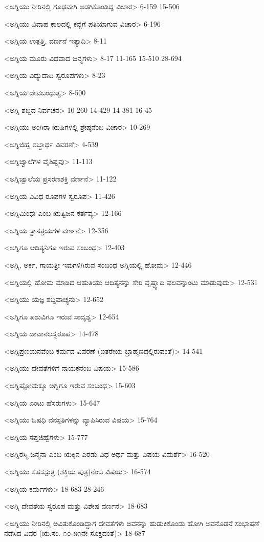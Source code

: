 <ಅಗ್ನಿಯು ನೀರಿನಲ್ಲಿ ಗೂಢವಾಗಿ ಅಡಗಿಕೊಂಡಿದ್ದ ವಿಚಾರ>
6-159
15-506

<ಅಗ್ನಿಯು ವಿವಾಹ ಕಾಲದಲ್ಲಿ ಕನ್ಯೆಗೆ ಪತಿಯಾಗುವ ವಿಚಾರ>
6-196

<ಅಗ್ನಿಯ ಉತ್ಪತ್ತಿ, ವರ್ಣನೆ ಇತ್ಯಾದಿ>
8-11

<ಅಗ್ನಿಯ ಮೂರು ವಿಧವಾದ ಜನ್ಮಗಳು>
8-17 
11-165 
15-510
28-694

<ಅಗ್ನಿಯ ವಿದ್ಯುದಾದಿ ಸ್ವರೂಪಗಳು>
8-23

<ಅಗ್ನಿಯ ದೇವಬಂಧುತ್ವ>
8-500

<ಅಗ್ನಿ ಶಬ್ದದ ನಿರ್ವಚನ>
10-260
14-429 
14-381
16-45

<ಅಗ್ನಿಯು ಅಂಗಿರಾ ಋಷಿಗಳಲ್ಲಿ ಶ್ರೇಷ್ಠನೆಂಬ ವಿಚಾರ>
10-269

<ಅಗ್ನಿಜಿಹ್ವ ಶಬ್ದಾರ್ಥ ವಿವರಣೆ>
4-539

<ಅಗ್ನಿಜ್ವಾಲೆಗಳ ವೈಶಿಷ್ಟ್ಯವು>
11-113

<ಅಗ್ನಿಜ್ವಾಲೆಯ ಪ್ರಸರಣಶಕ್ತಿ ವರ್ಣನೆ>
11-122

<ಅಗ್ನಿಯ ವಿವಿಧ ರೂಪಗಳ ಸ್ವರೂಪ>
11-426

<ಅಗ್ನಿಮಿಂಧಃ ಎಂಬ ಋತ್ವಿಜನ ಕರ್ತವ್ಯ>
12-166

<ಅಗ್ನಿಯ ಸ್ಥಾನತ್ರಯಗಳ ವರ್ಣನೆ>
12-356

<ಅಗ್ನಿಗೂ ಆದಿತ್ಯನಿಗೂ ಇರುವ ಸಂಬಂಧ>
12-403

<ಅಗ್ನಿ, ಅರ್ಕ, ಗಾಯತ್ರೀ ಇವುಗಳಿಗಿರುವ ಸಂಬಂಧ ಅಗ್ನಿಯಲ್ಲಿ ಹೋಮ>
12-446

<ಅಗ್ನಿಯಲ್ಲಿ ಹೋಮ ಮಾಡಿದ ಆಹುತಿಯು ಆದಿತ್ಯನನ್ನು ಸೇರಿ ವೃಷ್ಟ್ಯಾದಿ ಫಲವನ್ನುಂಟು ಮಾಡುವುದು>
12-531

<ಅಗ್ನಿಯು ಯಜ್ಞ ಶಬ್ದವಾಚ್ಯನು>
12-652

<ಅಗ್ನಿಗೂ ಪಶುವಿಗೂ ಇರುವ ಸಾದೃಶ್ಯ>
12-654

<ಅಗ್ನಿಯ ದಾವಾನಲಸ್ವರೂಪ>
14-478

<ಅಗ್ನಿಪ್ರಣಯನವೆಂಬ ಕರ್ಮದ ವಿವರಣೆ (ಐತರೇಯ ಬ್ರಾಹ್ಮಣದಲ್ಲಿರುವಂತೆ)>
14-541

<ಅಗ್ನಿಯು ದೇವತೆಗಳಿಗೆ ನಾಯಕನೆಂಬ ವಿಷಯ>
15-586

<ಅಗ್ನಿಷ್ಟೋಮಕ್ಕೂ ಅಗ್ನಿಗೂ ಇರುವ ಸಂಬಂಧ>
15-603

<ಅಗ್ನಿಯ ಎಂಟು ಹೆಸರುಗಳು>
15-647

<ಅಗ್ನಿಯು ಓಷಧಿ ವನಸ್ಪತಿಗಳನ್ನು ವ್ಯಾಪಿಸಿರುವ ವಿಷಯ>
15-764

<ಅಗ್ನಿಯ ಸಪ್ತಜಿಹ್ವೆಗಳು>
15-777

<ಅಗ್ನಿರಸ್ಮಿ ಜನ್ಮನಾ ಎಂಬ ಋಕ್ಕಿನ ಎರಡು ವಿಧ ಅರ್ಥ ಮತ್ತು ವಿಷಯ ವಿಮರ್ಶೆ>
16-520

<ಅಗ್ನಿಯು ಸಹಸಸ್ಪುತ್ರ (ಶಕ್ತಿಯ ಪುತ್ರ)ನೆಂಬ ವಿಷಯ>
16-574

<ಅಗ್ನಿಯ ಕರ್ಮಗಳು>
18-683 
28-246

<ಅಗ್ನಿ ದೇವತೆಯ ಸ್ವರೂಪ ಮತ್ತು ವಿಶೇಷ ವರ್ಣನೆ>
18-683

<ಅಗ್ನಿಯು ನೀರಿನಲ್ಲಿ ಅವಿತುಕೊಂಡಿದ್ದಾಗ ದೇವತೆಗಳು ಅವನನ್ನು ಹುಡುಕಿಕೊಂಡು ಹೋಗಿ ಅವನೊಡನೆ ಸಂಭಾಷಣೆ ನಡೆಸಿದ ವಿವರ (ಋ.ಸಂ. ೧೦-೫೧ನೇ ಸೂಕ್ತದಂತೆ)>
18-687


